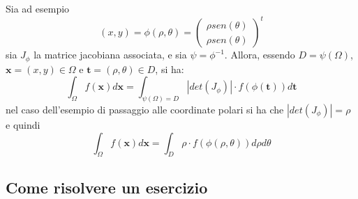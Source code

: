 \documentclass[a4paper,12pt]{article}
\begin{document}
Sia ad esempio $$(x, y) = \phi (\rho, \theta) = \left(\begin{matrix} \rho sen(\theta) \\  \rho sen(\theta)\end{matrix}\right)^t$$
 sia $J_\phi$ la matrice jacobiana associata, e sia $\psi=\phi^{-1}$.
Allora, essendo $D=\psi(\Omega)$,\\ $\boldsymbol{x} = (x, y) \in \Omega$ e $\boldsymbol{t} = (\rho, \theta) \in D$, si ha:
$$ \int_\Omega f(\boldsymbol{x}) d\boldsymbol{x} = \int_{\psi(\Omega)= D} |det(J_\phi)|\cdot f(\phi(\boldsymbol{t})) d\boldsymbol{t}  $$
nel caso dell'esempio di passaggio alle coordinate polari si ha che $|det(J_\phi)|=\rho$ e quindi
$$ \int_\Omega f(\boldsymbol{x}) d\boldsymbol{x} = \int_{ D} \rho \cdot f(\phi(\rho,\theta)) d\rho d\theta  $$

\subsection{Come risolvere un esercizio}
\end{document}
